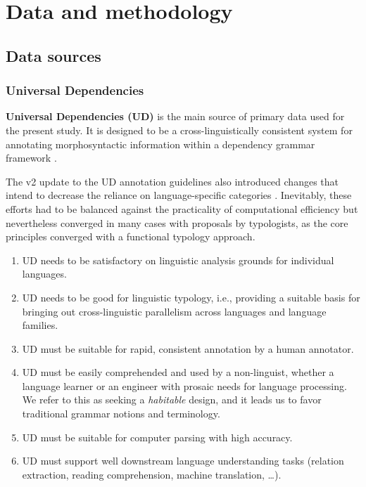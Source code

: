 \chapter{Data and methodology}

\section{Data sources}\label{sec:data}

\subsection{Universal Dependencies}\label{subsec:data_ud}


\textbf{Universal Dependencies (UD)} is the main source of primary data used for the present study. It is designed to be a cross-linguistically consistent system for annotating morphosyntactic information within a dependency grammar framework \citep{demarneffe2021}. 

The v2 update to the UD annotation guidelines also introduced changes that intend to decrease the reliance on language-specific categories \citep{nivre2020}. Inevitably, these efforts had to be balanced against the practicality of computational efficiency but nevertheless converged in many cases with proposals by typologists, as the core principles converged with a functional typology approach. \citet{croft2017}

\begin{enumerate}
    \item UD needs to be satisfactory on linguistic analysis grounds for individual languages.
    \item UD needs to be good for linguistic typology, i.e., providing a suitable basis for bringing out cross-linguistic parallelism across languages and language families.
    \item UD must be suitable for rapid, consistent annotation by a human annotator.
    \item UD must be easily comprehended and used by a non-linguist, whether a language learner or an engineer with prosaic needs for language processing. We refer to this as seeking a \textit{habitable} design, and it leads us to favor traditional grammar notions and terminology.
    \item UD must be suitable for computer parsing with high accuracy.
    \item UD must support well downstream language understanding tasks (relation extraction, reading comprehension, machine translation, \dots).
\end{enumerate}

